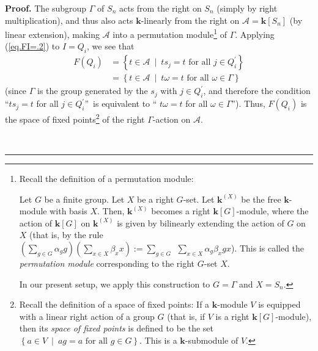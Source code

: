\documentclass[numbers=enddot,12pt,final,onecolumn,notitlepage]{scrartcl}%
\theoremstyle{definition}
\newenvironment{proof}[1][Proof]{\noindent\textbf{#1.} }{\ \rule{0.5em}{0.5em}}
\let\sumnonlimits\sum
\renewcommand{\sum}{\sumnonlimits\limits}
\begin{document}
\begin{proof}
The subgroup $\Gamma$ of $S_{n}$ acts from the right on $S_{n}$ (simply by
right multiplication), and thus also acts $\mathbf{k}$-linearly from the right
on $\mathcal{A}=\mathbf{k}\left[  S_{n}\right]  $ (by linear extension),
making $\mathcal{A}$ into a permutation module\footnote{Recall the definition
of a permutation module:
\par
Let $G$ be a finite group. Let $X$ be a right $G$-set. Let $\mathbf{k}%
^{\left(  X\right)  }$ be the free $\mathbf{k}$-module with basis $X$. Then,
$\mathbf{k}^{\left(  X\right)  }$ becomes a right $\mathbf{k}\left[  G\right]
$-module, where the action of $\mathbf{k}\left[  G\right]  $ on $\mathbf{k}%
^{\left(  X\right)  }$ is given by bilinearly extending the action of $G$ on
$X$ (that is, by the rule $\left(  \sum_{g\in G}\alpha_{g}g\right)  \left(
\sum_{x\in X}\beta_{x}x\right)  :=\sum_{g\in G}\ \ \sum_{x\in X}\alpha
_{g}\beta_{x}gx$). This is called the \emph{permutation module} corresponding
to the right $G$-set $X$.
\par
In our present setup, we apply this construction to $G=\Gamma$ and $X=S_{n}$.}
of $\Gamma$. Applying (\ref{eq.FI=.2}) to $I=Q_{i}$, we see that%
\begin{align*}
F\left(  Q_{i}\right)   &  =\left\{  t\in\mathcal{A}\ \mid\ ts_{j}=t\text{ for
all }j\in Q_{i}^{\prime}\right\}  \\
&  =\left\{  t\in\mathcal{A}\ \mid\ t\omega=t\text{ for all }\omega\in
\Gamma\right\}
\end{align*}
(since $\Gamma$ is the group generated by the $s_{j}$ with $j\in Q_{i}%
^{\prime}$, and therefore the condition \textquotedblleft$ts_{j}=t$ for all
$j\in Q_{i}^{\prime}$\textquotedblright\ is equivalent to \textquotedblleft%
$t\omega=t$ for all $\omega\in\Gamma$\textquotedblright). Thus, $F\left(
Q_{i}\right)  $ is the space of fixed points\footnote{Recall the definition of
a space of fixed points: If a $\mathbf{k}$-module $V$ is equipped with a
linear right action of a group $G$ (that is, if $V$ is a right $\mathbf{k}%
\left[  G\right]  $-module), then its \emph{space of fixed points} is defined
to be the set $\left\{  a\in V\ \mid\ ag=a\text{ for all }g\in G\right\}  $.
This is a $\mathbf{k}$-submodule of $V$.} of the right $\Gamma$-action on
$\mathcal{A}$.


\end{proof}
\end{document}
